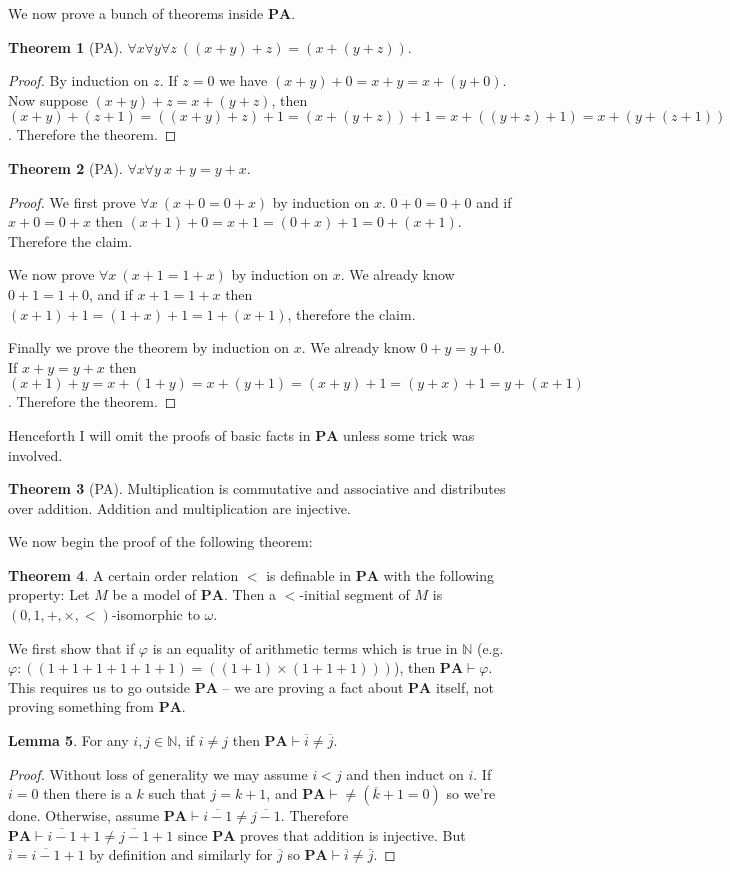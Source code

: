 \documentclass[12pt]{report}
\newcommand{\NN}{\mathbb{N}}
\newcommand{\PA}{\mathbf{PA}}
\newcommand{\proves}{\vdash}
\theoremstyle{definition}
\newtheorem{theorem}{Theorem}[chapter]
\newtheorem{lemma}[theorem]{Lemma}
\begin{document}
We now prove a bunch of theorems inside $\PA$.
\begin{theorem}[PA]
$\forall x \forall y\forall z~((x+y)+z)=(x+(y+z))$.
\end{theorem}
\begin{proof}
By induction on $z$. If $z = 0$ we have $(x+y)+0= x+y=x+(y+0)$. Now suppose $(x+y)+z = x+(y+z)$, then $(x+y)+(z+1) = ((x+y)+z)+1 = (x+(y+z))+1 = x+((y+z)+1) = x+(y+(z+1))$. Therefore the theorem.
\end{proof}
\begin{theorem}[PA]
$\forall x \forall y ~x+y=y+x$.
\end{theorem}
\begin{proof}
We first prove $\forall x~(x+0=0+x)$ by induction on $x$. $0 + 0 = 0 + 0$ and if $x+0=0+x$ then $(x+1)+0=x+1 = (0+x)+1 = 0+(x+1)$. Therefore the claim.

We now prove $\forall x~(x+1=1+x)$ by induction on $x$. We already know $0+1=1+0$, and if $x+1=1+x$ then $(x+1)+1 = (1+x)+1 = 1+(x+1)$, therefore the claim.

Finally we prove the theorem by induction on $x$. We already know $0+y=y+0$. If $x+y=y+x$ then $(x+1)+y = x+(1+y) = x+(y+1) = (x+y)+1 = (y+x)+1 = y+(x+1)$. Therefore the theorem.
\end{proof}
Henceforth I will omit the proofs of basic facts in $\PA$ unless some trick was involved.
\begin{theorem}[PA]
Multiplication is commutative and associative and distributes over addition. Addition and multiplication are injective.
\end{theorem}
We now begin the proof of the following theorem:
\begin{theorem}
\label{structure theorem for PA}
A certain order relation $<$ is definable in $\PA$ with the following property: Let $M$ be a model of $\PA$. Then a $<$-initial segment of $M$ is $(0, 1, +, \times, <)$-isomorphic to $\omega$.
\end{theorem}
We first show that if $\varphi$ is an equality of arithmetic terms which is true in $\NN$ (e.g. $\varphi: ((1+1+1+1+1+1)=((1+1)\times(1+1+1)))$), then $\PA \proves \varphi$. This requires us to go outside $\PA$ -- we are proving a fact about $\PA$ itself, not proving something from $\PA$.
\begin{lemma}
For any $i,j \in \NN$, if $i \neq j$ then $\PA \proves \overline i \neq \overline j$.
\end{lemma}
\begin{proof}
Without loss of generality we may assume $i < j$ and then induct on $i$. If $i = 0$ then there is a $k$ such that $j = k + 1$, and $\PA \proves \neq(\overline k + 1 = 0)$ so we're done. Otherwise, assume $\PA \proves \overline{i-1} \neq \overline{j-1}$. Therefore $\PA \proves \overline{i-1} + 1 \neq \overline{j-1} + 1$ since $\PA$ proves that addition is injective.
But $\overline i = \overline{i-1} + 1$ by definition and similarly for $\overline j$ so $\PA \proves \overline i \neq \overline j$.
\end{proof}
\end{document}

